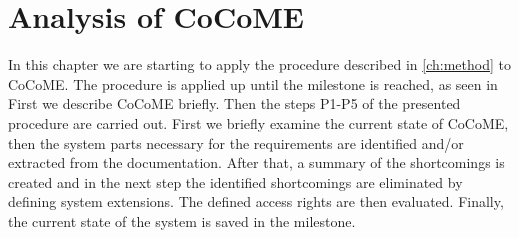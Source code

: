 
\chapter{Analysis of CoCoME}
\label{ch:cocome}
In this chapter we are starting to apply the procedure described in \autoref{ch:method} to CoCoME. The procedure is applied up until the milestone is reached, as seen in %
First we describe CoCoME briefly. Then the steps P1-P5 of the presented procedure are carried out. First we briefly examine the current state of CoCoME, then the system parts necessary for the requirements are identified and/or extracted from the documentation. After that, a summary of the shortcomings is created and in the next step the identified shortcomings are eliminated by defining system extensions. The defined access rights are then evaluated. Finally, the current state of the system is saved in the milestone.
